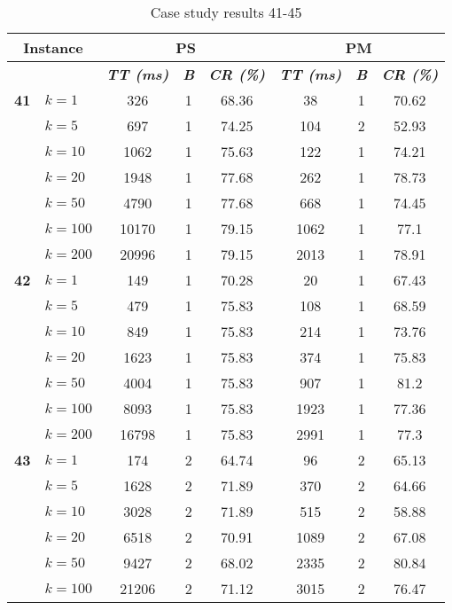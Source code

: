     \begin{table}[htbp]
    \caption{Case study results 41-45}
    \centering
    \begin{tabular}{|l|l|c|c|c|c|c|c|}
    \hline
    \multicolumn{ 2}{|c|}{\textbf{Instance}} & \multicolumn{ 3}{c|}{\textbf{PS}} & \multicolumn{ 3}{c|}{\textbf{PM}} \\ \hline
    \multicolumn{ 2}{|l|}{} & \textbf{\textit{TT (ms)}} & \textbf{\textit{B}} & \textbf{\textit{CR (\%)}} & \textbf{\textit{TT (ms)}} & \textbf{\textit{B}} & \textbf{\textit{CR (\%)}} \\ \hline
    \multicolumn{1}{|r|}{\textbf{41}} & $k=1$ & 326 & 1 & 68.36 & 38 & 1 & 70.62 \\ 
     & $k=5$ & 697 & 1 & 74.25 & 104 & 2 & 52.93 \\ 
     & $k=10$ & 1062 & 1 & 75.63 & 122 & 1 & 74.21 \\ 
     & $k=20$ & 1948 & 1 & 77.68 & 262 & 1 & 78.73 \\ 
     & $k=50$ & 4790 & 1 & 77.68 & 668 & 1 & 74.45 \\ 
     & $k=100$ & 10170 & 1 & 79.15 & 1062 & 1 & 77.1 \\ 
     & $k=200$ & 20996 & 1 & 79.15 & 2013 & 1 & 78.91 \\ \hline
    \multicolumn{1}{|r|}{\textbf{42}} & $k=1$ & 149 & 1 & 70.28 & 20 & 1 & 67.43 \\ 
     & $k=5$ & 479 & 1 & 75.83 & 108 & 1 & 68.59 \\ 
     & $k=10$ & 849 & 1 & 75.83 & 214 & 1 & 73.76 \\ 
     & $k=20$ & 1623 & 1 & 75.83 & 374 & 1 & 75.83 \\ 
     & $k=50$ & 4004 & 1 & 75.83 & 907 & 1 & 81.2 \\ 
     & $k=100$ & 8093 & 1 & 75.83 & 1923 & 1 & 77.36 \\ 
     & $k=200$ & 16798 & 1 & 75.83 & 2991 & 1 & 77.3 \\ \hline
    \multicolumn{1}{|r|}{\textbf{43}} & $k=1$ & 174 & 2 & 64.74 & 96 & 2 & 65.13 \\ 
     & $k=5$ & 1628 & 2 & 71.89 & 370 & 2 & 64.66 \\ 
     & $k=10$ & 3028 & 2 & 71.89 & 515 & 2 & 58.88 \\ 
     & $k=20$ & 6518 & 2 & 70.91 & 1089 & 2 & 67.08 \\ 
     & $k=50$ & 9427 & 2 & 68.02 & 2335 & 2 & 80.84 \\ 
     & $k=100$ & 21206 & 2 & 71.12 & 3015 & 2 & 76.47 \\ 

\end{tabular}
\end{table}
